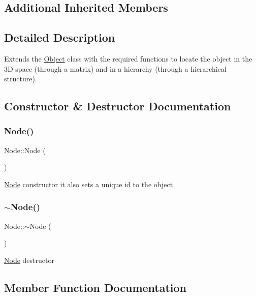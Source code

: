 \subsection*{Additional Inherited Members}


\subsection{Detailed Description}
Extends the \hyperlink{classObject}{Object} class with the required functions to locate the object in the 3D space (through a matrix) and in a hierarchy (through a hierarchical structure). 

\subsection{Constructor \& Destructor Documentation}
\mbox{\label{classNode_ad7a34779cad45d997bfd6d3d8043c75f}} 
\subsubsection{\texorpdfstring{Node()}{Node()}}
{\footnotesize\ttfamily Node\+::\+Node (\begin{DoxyParamCaption}{ }\end{DoxyParamCaption})}

\hyperlink{classNode}{Node} constructor it also sets a unique id to the object \mbox{\label{classNode_aa0840c3cb5c7159be6d992adecd2097c}} 
\subsubsection{\texorpdfstring{$\sim$\+Node()}{~Node()}}
{\footnotesize\ttfamily Node\+::$\sim$\+Node (\begin{DoxyParamCaption}{ }\end{DoxyParamCaption})\hspace{0.3cm}{\ttfamily [virtual]}}

\hyperlink{classNode}{Node} destructor 

\subsection{Member Function Documentation}
\mbox{\label{classNode_a5314d9f959698d8658c8e4b363e7ac8a}} 
